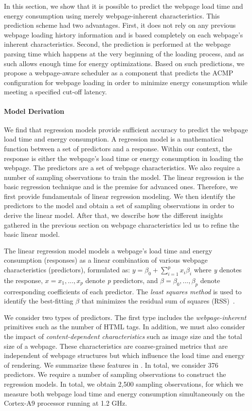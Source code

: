 In this section, we show that it is possible to predict the webpage load time and energy consumption using merely webpage-inherent characteristics. This prediction scheme had two advantages. First, it does not rely on any previous webpage loading history information and is based completely on each webpage's inherent characteristics. Second, the prediction is performed at the webpage parsing time which happens at the very beginning of the loading process, and as such allows enough time for energy optimizations. Based on such predictions, we propose a webpage-aware scheduler as a \webrt component that predicts the ACMP configuration for webpage loading in order to minimize energy consumption while meeting a specified cut-off latency.

\paragraph{Model Derivation} We find that regression models provide sufficient accuracy to predict the webpage load time and energy consumption. A regression model is a mathematical function between a set of predictors and a response. Within our context, the response is either the webpage's load time or energy consumption in loading the webpage. The predictors are a set of webpage characteristics. We also require a number of sampling observations to train the model. The linear regression is the basic regression technique and is the premise for advanced ones. Therefore, we first provide fundamentals of linear regression modeling. We then identify the predictors to the model and obtain a set of sampling observations in order to derive the linear model. After that, we describe how the different insights gathered in the previous section on webpage characteristics led us to refine the basic linear model.

The linear regression model models a webpage's load time and energy consumption (responses) as a linear combination of various webpage characteristics (predictors), formulated as: $y = \beta_0 + \sum_{i=1}^{p} x_i \beta_i$ where \textit{y} denotes the response, \textit{$x = x_{1},...,x_{p}$} denote \textit{p} predictors, and \textit{$\beta = \beta_{0},...,\beta_{p}$} denote corresponding coefficients of each predictor. The \textit{least squares method} is used to identify the best-fitting $\beta$ that minimizes the residual sum of squares (RSS)~\cite{ESL}.

We consider two types of predictors. The first type includes the \textit{webpage-inherent} primitives such as the number of HTML tags. In addition, we must also consider the impact of \textit{content-dependent characteristics} such as image size and the total size of a webpage. These characteristics are coarse-grained metrics that are independent of webpage structures but which influence the load time and energy of rendering. We summarize these features in . In total, we consider 376 predictors. We require a number of sampling observations to construct the regression models. In total, we obtain 2,500 sampling observations, for which we measure both webpage load time and energy consumption simultaneously on the Cortex-A9 processor running at 1.2 GHz.

